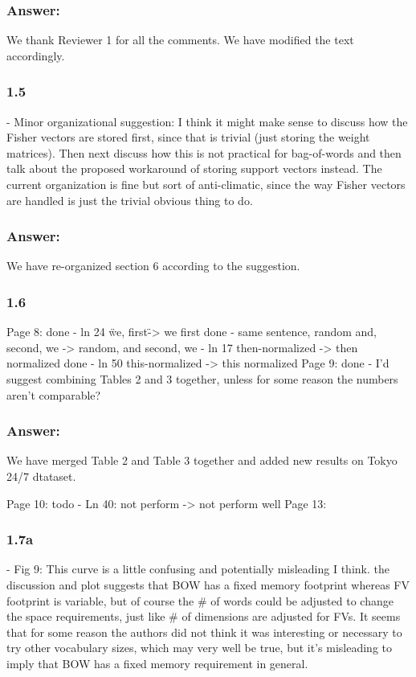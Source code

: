 \documentclass[a4paper,12pt]{article}
\begin{document}
\subsubsection*{Answer:}
We thank Reviewer 1 for all the comments. We have modified the text accordingly.

\subsubsection*{1.5}
- Minor organizational suggestion: I think it might make sense to discuss how the Fisher vectors are stored first, since that is trivial (just storing the weight matrices). Then next discuss how this is not practical for bag-of-words and then talk about the proposed workaround of storing support vectors instead. The current organization is fine but sort of anti-climatic, since the way Fisher vectors are handled is just the trivial obvious thing to do.

\subsubsection*{Answer:}
We have re-organized section 6 according to the suggestion. 

\subsubsection*{1.6}
Page 8:
done - ln 24 \"we, first\" -> we first
done - same sentence, random and, second, we -> random, and second, we - ln 17 then-normalized -> then normalized
done - ln 50 this-normalized -> this normalized
 Page 9:
done - I'd suggest combining Tables 2 and 3 together, unless for some reason the numbers aren't comparable?
\subsubsection*{Answer:}
We have merged Table 2 and Table 3 together and added new results on Tokyo 24/7 dtataset.

Page 10:
todo - Ln 40: not perform -> not perform well
 Page 13:

\subsubsection*{1.7a}
- Fig 9: This curve is a little confusing and potentially misleading I think. the discussion and plot suggests that BOW has a fixed memory footprint whereas FV footprint is variable, but of course the \# of words could be adjusted to change the space requirements, just like \# of dimensions are adjusted for FVs. It seems that for some reason the authors did not think it was interesting or necessary to try other vocabulary sizes, which may very well be true, but it's misleading to imply that BOW has a fixed memory requirement in general.
\end{document}
